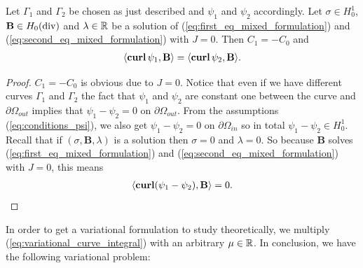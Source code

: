 \documentclass[../master_thesis.tex]{subfiles}
\begin{document}
\begin{proposition}\label{prop:different_curve_same_curve_integral_substitute}
    Let $\Gamma_1$ and $\Gamma_2$ be chosen as just described and $\psi_1$ 
    and $\psi_2$ accordingly. Let $\sigma \in H^1_0$, $\mathbf{B} \in H_0(\diver)$ 
    and $\lambda \in \real$ be a solution of 
    (\ref{eq:first_eq_mixed_formulation}) and (\ref{eq:second_eq_mixed_formulation})
    with $J=0$.
    Then $C_1 = -C_0$ and
    \begin{align*}
        \langle \veccurl \psi_1, \mathbf{B} \rangle = \langle \veccurl \psi_2, \mathbf{B} \rangle.
    \end{align*}
\end{proposition}
\begin{proof}
    $C_1 = -C_0$ is obvious due to $J=0$. Notice that even if we have different curves 
    $\Gamma_1$ and $\Gamma_2$ the fact that $\psi_1$ and $\psi_2$ are constant one 
    between the curve and $\partial \Omega_{out}$ implies that 
    $\psi_1 - \psi_2 = 0$ on $\partial\Omega_{out}$. From the assumptions (\ref{eq:conditions_psi}), 
    we also get 
    $\psi_1 - \psi_2 = 0$ on $\partial\Omega_{in}$ so in total 
    $\psi_1 - \psi_2 \in H^1_0$. Recall that if $(\sigma,\mathbf{B},\lambda)$ is a solution
    then $\sigma = 0$ and $\lambda=0$. So because $\mathbf{B}$ solves (\ref{eq:first_eq_mixed_formulation}) and 
    (\ref{eq:second_eq_mixed_formulation}) with $J=0$, this means
    \begin{align*}
        \langle \veccurl (\psi_1 - \psi_2), \mathbf{B} \rangle = 0.
    \end{align*}
\end{proof}

In order to get a variational 
formulation to study theoretically,
 we multiply (\ref{eq:variational_curve_integral}) with an arbitrary $\mu \in \real$. 
In conclusion, we have the following variational problem:
\end{document}
